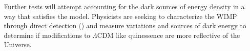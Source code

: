 \documentclass{paper}
\begin{document}
  Further tests will attempt accounting for the dark sources of
  energy density in a way that satisfies the model. Physicists are seeking to
  characterize the WIMP through direct detection (\cite{PETER201445}) and
  measure variations and sources of dark energy to determine if modifications
  to $\Lambda$CDM like quinessence are more reflective of the Universe.


\pagebreak
\begin{singlespace}
\printbibliography
\end{singlespace}

\end{document}
